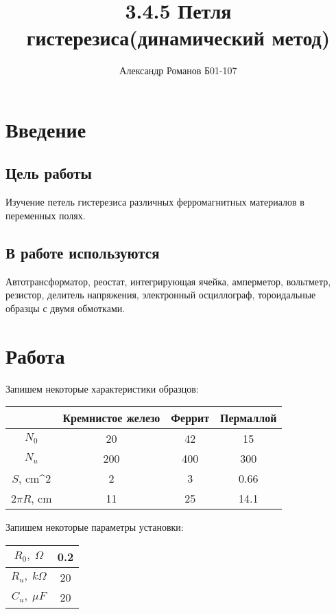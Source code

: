 \documentclass{article}
\author{Александр Романов Б01-107}
\title {3.4.5 Петля гистерезиса(динамический метод)}
\date{}
\begin{document}
\maketitle
\section{Введение}
\subsection{Цель работы}
Изучение петель гистерезиса различных ферромагнитных материалов в переменных полях.
\subsection{В работе используются}
Автотрансформатор, реостат, интегрирующая ячейка, амперметор, вольтметр, резистор, делитель напряжения, электронный
осциллограф, тороидальные образцы с двумя обмотками.

\section{Работа}
Запишем  некоторые характеристики образцов:
\begin{table}[H]
\centering
    \begin{tabular}{|c|c|c|c|}
        \hline
                    &Кремнистое железо  &Феррит &Пермаллой\\\hline
        $N_0$         &20                 &42     &15     \\\hline
        $N_u$         &200                &400    &300    \\\hline
        $S$, cm^2     &2                  &3      &0.66   \\\hline
        $2\pi R$, cm  &11                 &25     &14.1   \\\hline
    \end{tabular}
\end{table}
Запишем некоторые параметры установки:
\begin{table}[H]
    \centering
        \begin{tabular}{|c|c|}
            \hline
            $R_0,\; \Omega$&0.2\\\hline
            $R_u,\; k\Omega$&20\\\hline
            $C_u,\; \mu F$  &20\\\hline
        \end{tabular}
    \end{table}
\end{document}
